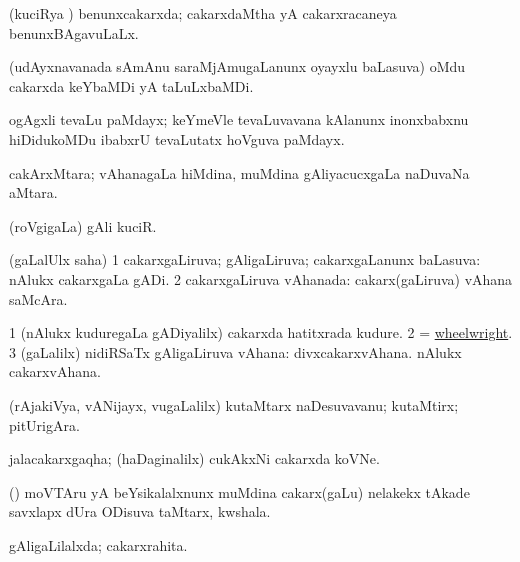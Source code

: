 \bentry
{} 
\gl{\gu}
\expl{}
\bmng
(kuciRya \vi) benunxcakarxda; cakarxdaMtha yA cakarxracaneya benunxBAgavuLaLx. 
\emng
\eentry

\bentry
{} 
\gl{\nA}
\expl{}
\bmng
(udAyxnavanada sAmAnu saraMjAmugaLanunx oyayxlu baLasuva) oMdu cakarxda keYbaMDi yA taLuLxbaMDi. 
\emng

\noindent 
\gl{\pagu}
\expl{}
\bmng
{} ogAgxli tevaLu paMdayx; keYmeVle tevaLuvavana kAlanunx inonxbabxnu hiDidukoMDu ibabxrU tevaLutatx hoVguva paMdayx. 
\emng
\eentry

\bentry
{} 
\gl{\nA}
\expl{}
\bmng
cakArxMtara; vAhanagaLa hiMdina, muMdina gAliyacucxgaLa naDuvaNa aMtara. 
\emng
\eentry

\bentry
{} 
\gl{\nA}
\expl{}
\bmng
(roVgigaLa) gAli kuciR.  
\emng
\eentry

\bentry
{} 
\gl{\gu}
\expl{}
\bmng
(\saMpa gaLalUlx saha) 
\bnum
\num{1} cakarxgaLiruva; gAligaLiruva; cakarxgaLanunx baLasuva:  nAlukx cakarxgaLa gADi. 
\num{2} cakarxgaLiruva vAhanada:  cakarx(gaLiruva) vAhana saMcAra. 
\enum
\emng
\eentry

\bentry
{} 
\gl{\nA}
\expl{}
\bmng
\bnum
\num{1} (nAlukx kuduregaLa gADiyalilx) cakarxda hatitxrada kudure. 
\num{2} = \hyperlink{wheelwright}{wheelwright}. 
\num{3} (\saMpa gaLalilx) nidiRSaTx gAligaLiruva vAhana:  divxcakarxvAhana.  nAlukx cakarxvAhana. 
\enum
\emng
\eentry

\bentry
{} 
\gl{\nA}
\expl{}
\bmng
(rAjakiVya, vANijayx, \mo vugaLalilx) kutaMtarx naDesuvavanu; kutaMtirx; pitUrigAra. 
\emng
\eentry

\bentry
{} 
\gl{\nA}
\expl{}
\bmng
jalacakarxgaqha; (haDaginalilx) cukAkxNi cakarxda koVNe. 
\emng
\eentry

\bentry
{} 
\gl{\nA}
\expl{}
\bmng
(\ashi) moVTAru yA beYsikalalxnunx muMdina cakarx(gaLu) nelakekx tAkade savxlapx dUra ODisuva taMtarx, kwshala. 
\emng
\eentry

\bentry
{} 
\gl{\gu}
\expl{}
\bmng
gAligaLilalxda; cakarxrahita. 
\emng
\eentry

